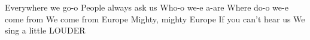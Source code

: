 \beginverse
Everywhere we go-o 
People always ask us 
Who-o we-e a-are 
Where do-o we-e come from 
We come from Europe 
Mighty, mighty Europe 
If you can't hear us 
We sing a little LOUDER 
\endverse
\endsong

